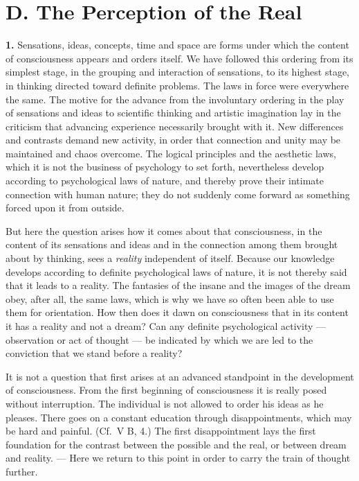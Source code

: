 \documentclass[12pt,a4paper]{book}
\newcommand{\opage}[1]{\marginnote{\footnotesize\textit{[#1]}}}
\begin{document}
\opage{251}%
\section*{D. The Perception of the Real}

\textbf{1.} Sensations, ideas, concepts, time and space are forms under
which the content of consciousness appears and orders itself. We have
followed this ordering from its simplest stage, in the grouping and
interaction of sensations, to its highest stage, in thinking directed
toward definite problems. The laws in force were everywhere the same.
The motive for the advance from the involuntary ordering in the play of
sensations and ideas to scientific thinking and artistic imagination lay
in the criticism that advancing experience necessarily brought with it.
New differences and contrasts demand new activity, in order that
connection and unity may be maintained and chaos overcome. The logical
principles and the aesthetic laws, which it is not the business of
psychology to set forth, nevertheless develop according to psychological
laws of nature, and thereby prove their intimate connection with human
nature; they do not suddenly come forward as something forced upon it
from outside.

But here the question arises how it comes about that consciousness, in
the content of its sensations and ideas and in the connection among them
brought about by thinking, sees a \emph{reality} independent of itself.
Because our knowledge develops according to definite psychological laws
of nature, it is not thereby said that it leads to a reality. The
fantasies of the insane and the images of the dream obey, after all, the
same laws, which is why we have so often been able to use them for
orientation. How then does it dawn on consciousness that in its content
it has a reality and not a dream? Can any definite psychological activity
--- observation or act of thought --- be indicated by which we are led
to the conviction that we stand before a reality?

It is not a question that first arises at an advanced standpoint in the
development of consciousness. From the first beginning of consciousness
it is really posed without interruption. The individual is not allowed
to order his ideas as he pleases. There goes on a constant education
through disappointments, which may be hard and painful. (Cf.\ V B, 4.)
The first disappointment lays the first foundation for the contrast
\opage{252}between the possible and the real, or between dream and
reality. --- Here we return to this point in order to carry the train of
thought further.
\end{document}
